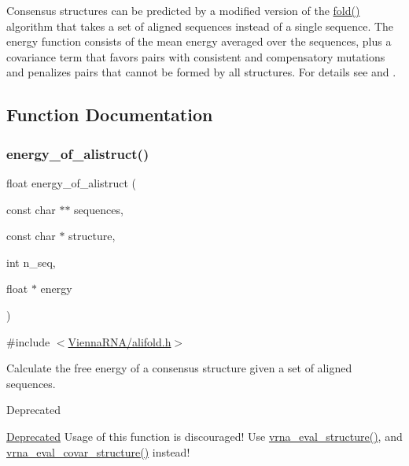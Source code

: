 Consensus structures can be predicted by a modified version of the \hyperlink{group__mfe__fold__single_gaadafcb0f140795ae62e5ca027e335a9b}{fold()} algorithm that takes a set of aligned sequences instead of a single sequence. The energy function consists of the mean energy averaged over the sequences, plus a covariance term that favors pairs with consistent and compensatory mutations and penalizes pairs that cannot be formed by all structures. For details see \cite{hofacker:2002} and \cite{bernhart:2008}. 

\subsection{Function Documentation}
\mbox{\label{group__consensus__fold_ga1c48869c03b49a342bf4cbdd61900081}} 
\subsubsection{\texorpdfstring{energy\+\_\+of\+\_\+alistruct()}{energy\_of\_alistruct()}}
{\footnotesize\ttfamily float energy\+\_\+of\+\_\+alistruct (\begin{DoxyParamCaption}\item[{const char $\ast$$\ast$}]{sequences,  }\item[{const char $\ast$}]{structure,  }\item[{int}]{n\+\_\+seq,  }\item[{float $\ast$}]{energy }\end{DoxyParamCaption})}



{\ttfamily \#include $<$\hyperlink{alifold_8h}{Vienna\+R\+N\+A/alifold.\+h}$>$}



Calculate the free energy of a consensus structure given a set of aligned sequences. 

\begin{DoxyRefDesc}{Deprecated}
\item[\hyperlink{deprecated__deprecated000015}{Deprecated}]Usage of this function is discouraged! Use \hyperlink{group__eval_ga58f199f1438d794a265f3b27fc8ea631}{vrna\+\_\+eval\+\_\+structure()}, and \hyperlink{group__eval_ga6cea75c0eb9857fb59172be54cab09e0}{vrna\+\_\+eval\+\_\+covar\+\_\+structure()} instead!\end{DoxyRefDesc}



